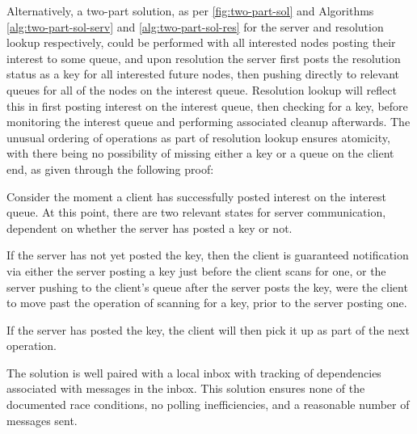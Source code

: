Alternatively, a two-part solution, as per \cref{fig:two-part-sol} and Algorithms \ref{alg:two-part-sol-serv} and \ref{alg:two-part-sol-res} for the server and resolution lookup respectively, could be performed with all interested nodes posting their interest to some queue, and upon resolution the server first posts the resolution status as a key for all interested future nodes, then pushing directly to relevant queues for all of the nodes on the interest queue.
Resolution lookup will reflect this in first posting interest on the interest queue, then checking for a key, before monitoring the interest queue and performing associated cleanup afterwards.
The unusual ordering of operations as part of resolution lookup ensures atomicity, with there being no possibility of missing either a key or a queue on the client end, as given through the following proof:

Consider the moment a client has successfully posted interest on the interest queue.
At this point, there are two relevant states for server communication, dependent on whether the server has posted a key or not.

If the server has not yet posted the key, then the client is guaranteed notification via either the server posting a key just before the client scans for one, or the server pushing to the client's queue after the server posts the key, were the client to move past the operation of scanning for a key, prior to the server posting one.

If the server has posted the key, the client will then pick it up as part of the next operation.

The solution is well paired with a local inbox with tracking of dependencies associated with messages in the inbox.
This solution ensures none of the documented race conditions, no polling inefficiencies, and a reasonable number of messages sent.
